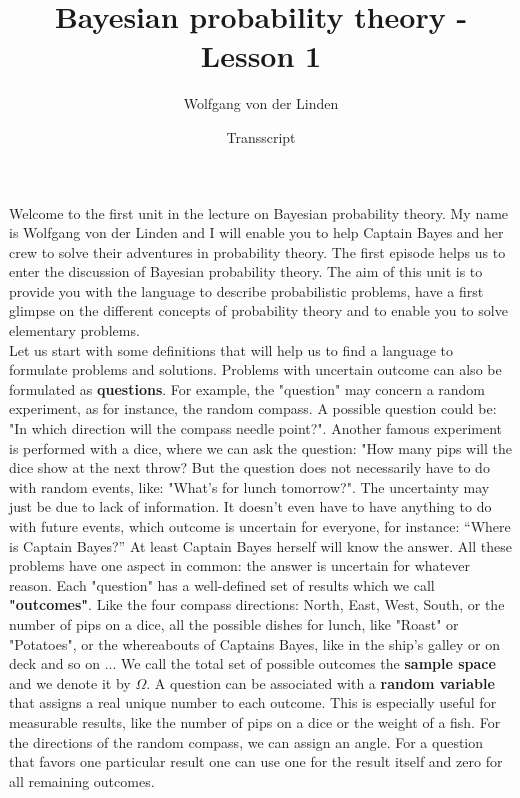 \documentclass[12pt, a4paper]{scrartcl}
\title{Bayesian probability theory - Lesson 1}
\author{Wolfgang von der Linden}
\date{Transscript}
\begin{document}
\setlength{\parindent}{0pt}
\maketitle
\onehalfspacing

Welcome to the first unit in the lecture on Bayesian probability theory. My name is Wolfgang von der Linden and I will enable you to help Captain Bayes and her crew to solve their adventures in probability theory.
The first episode helps us to enter the discussion of Bayesian probability theory.
The aim of this unit is to provide you with the language to describe probabilistic problems, have a first glimpse on the different concepts of probability theory and to enable you to solve elementary problems.\\

Let us start with some definitions that will help us to find a language to formulate problems and solutions.
Problems with uncertain outcome can also be formulated as \textbf{questions}. For example, the "question" may concern a random experiment, as for instance, the random compass. A possible question could be: "In which direction will the compass needle point?". 
Another famous experiment is performed with a dice, where we can ask the question: "How many pips will the dice show at the next throw? 
But the question does not necessarily have to do with random events, like: "What’s for lunch tomorrow?". The uncertainty may just be due to lack of information. It doesn’t even have to have anything to do with future events, which outcome is uncertain for everyone, for instance: “Where is Captain Bayes?” At least Captain Bayes herself will know the answer. All these problems have one aspect in common: the answer is uncertain for whatever reason.
Each "question" has a well-defined set of results which we call \textbf{"outcomes"}. Like the four compass directions: North, East, West, South, or the number of pips on a dice, all the possible dishes for lunch, like "Roast" or "Potatoes", or the whereabouts of Captains Bayes, like in the ship’s galley or on deck and so on ...
We call the total set of possible outcomes the \textbf{sample space} and we denote it by \textbf{$\Omega$}. A question can be associated with a \textbf{random variable} that assigns a real unique number to each outcome. This is especially useful for measurable results, like the number of pips on a dice or the weight of a fish. 
For the directions of the random compass, we can assign an angle. For a question that favors one particular result one can use one for the result itself and zero for all remaining outcomes.\\
\end{document}
